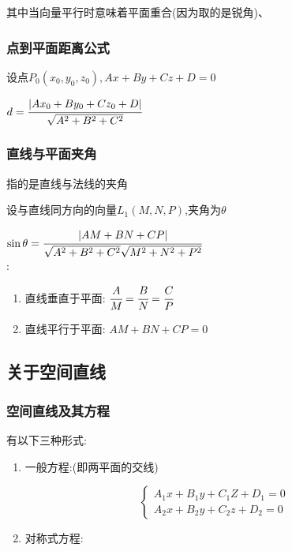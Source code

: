 \documentclass[UTF8,12pt]{ctexbook}
\begin{document}
{{{{      其中当向量平行时意味着平面重合(因为取的是锐角)、
    }%

    \subsubsection{点到平面距离公式}{
      设点$P_0(x_0,y_0,z_0),Ax + By + Cz + D = 0$

      $d = \cfrac{|Ax_0 + By_0 + Cz_0 + D|}{\sqrt{A^2 + B^2 + C^2}}$
    }%

    \subsubsection{直线与平面夹角}{
      指的是直线与法线的夹角

      设与直线同方向的向量$L_1(M,N,P)$,夹角为$\theta$

      $\sin\theta = \cfrac{|AM + BN + CP|}{\sqrt{A^2 + B^2 + C^2}\sqrt{M^2 + N^2 + P^2}}$\\

      :
      \begin{enumerate}
        \item 直线垂直于平面: $\cfrac{A}{M} = \cfrac{B}{N} = \cfrac{C}{P}$
        \item 直线平行于平面: $AM + BN + CP = 0$
      \end{enumerate}
    }%

  }%

  \subsection{关于空间直线}{

    \subsubsection{空间直线及其方程}{
      有以下三种形式:

      \begin{enumerate}
        \item {
              一般方程:(即两平面的交线)

              $$
                \begin{cases}
                  A_1x + B_1y + C_1Z + D_1 = 0 \\
                  A_2x + B_2y + C_2z + D_2 = 0
                \end{cases}
              $$
              }
        \item {
              对称式方程:

}
\end{enumerate}}}}}
\end{document}

